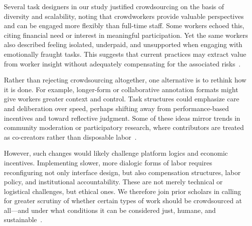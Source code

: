 Several task designers in our study justified crowdsourcing on the basis of diversity and scalability, noting that crowdworkers provide valuable perspectives and can be engaged more flexibly than full-time staff. Some workers echoed this, citing financial need or interest in meaningful participation. Yet the same workers also described feeling isolated, underpaid, and unsupported when engaging with emotionally fraught tasks. This suggests that current practices may extract value from worker insight without adequately compensating for the associated risks~.

Rather than rejecting crowdsourcing altogether, one alternative is to rethink how it is done. For example, longer-form or collaborative annotation formats might give workers greater context and control. Task structures could emphasize care and deliberation over speed, perhaps shifting away from performance-based incentives and toward reflective judgment. Some of these ideas mirror trends in community moderation or participatory research, where contributors are treated as co-creators rather than disposable labor~.

However, such changes would likely challenge platform logics and economic incentives. Implementing slower, more dialogic forms of labor requires reconfiguring not only interface design, but also compensation structures, labor policy, and institutional accountability. These are not merely technical or logistical challenges, but ethical ones. We therefore join prior scholars in calling for greater scrutiny of whether certain types of work should be crowdsourced at all—and under what conditions it can be considered just, humane, and sustainable~. 
